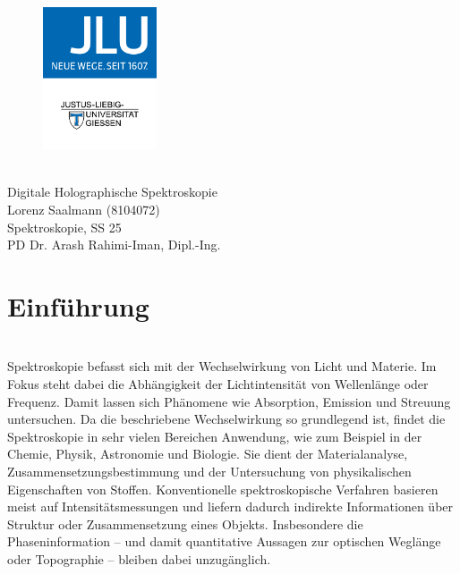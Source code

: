 \documentclass[10pt,twocolumn,a4paper]{article}
\begin{document}
\setlength{\parindent}{0pt}


\begin{titlepage}
    \centering
    \begin{figure}
        \centering
        \includegraphics[width=0.3\textwidth]{images/jlu_logo.jpeg}
    \end{figure}
    \vspace*{2cm}
     \\
    \Large{Digitale Holographische Spektroskopie} \\
    \vspace{2cm}
    \normalsize{Lorenz Saalmann (8104072)} \\
    \vfill
    \normalsize{{Spektroskopie, SS 25}} \\
    \small{PD Dr. Arash Rahimi-Iman, Dipl.-Ing.} \\
\end{titlepage}

\newpage

\section{Einführung}
\vspace{-0.3cm}
\hspace{.0cm}
\vspace{0.4cm}
\\
\small
Spektroskopie befasst sich mit der Wechselwirkung von Licht und Materie. Im Fokus steht dabei die Abhängigkeit der Lichtintensität von Wellenlänge oder Frequenz. Damit lassen sich Phänomene wie Absorption, Emission und Streuung untersuchen. Da die beschriebene Wechselwirkung so grundlegend ist, findet die Spektroskopie in sehr vielen Bereichen Anwendung, wie zum Beispiel in der Chemie, Physik, Astronomie und Biologie. Sie dient der Materialanalyse, Zusammensetzungsbestimmung und der Untersuchung von physikalischen Eigenschaften von Stoffen. Konventionelle spektroskopische Verfahren basieren meist auf Intensitätsmessungen und liefern dadurch indirekte Informationen über Struktur oder Zusammensetzung eines Objekts. Insbesondere die Phaseninformation -- und damit quantitative Aussagen zur optischen Weglänge oder Topographie -- bleiben dabei unzugänglich.
\end{document}
